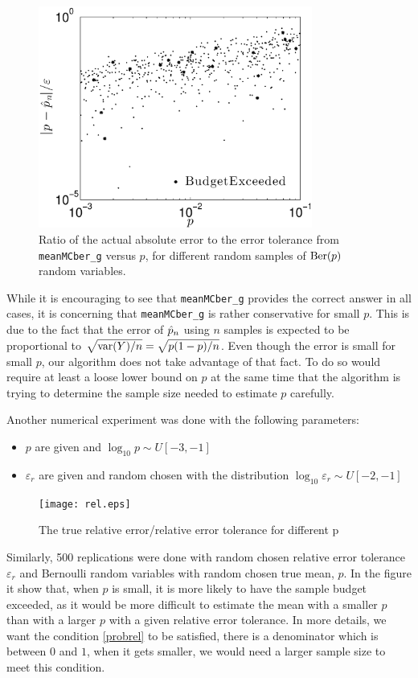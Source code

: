 \documentclass{iitthesis}
\theoremstyle{definition}
\begin{document}
  \begin{figure}[htbp]
    \centering
    \includegraphics[width=9cm]{abs.eps} %
    \caption{Ratio of the actual absolute error to the error tolerance from {\tt meanMCber\_g} versus $p$, for different random samples of $\operatorname{Ber}(p)$ random variables.}
    \label{fig:abserrex}
 \end{figure}

 
While it is encouraging to see that {\tt meanMCber\_g} provides the correct answer in all cases, it is concerning that {\tt meanMCber\_g} is rather conservative for small $p$.  This is due to the fact that the error of $\hat{p}_n$ using $n$ samples is expected to be proportional to $\sqrt{\operatorname{var}(Y)/n}=\sqrt{p(1-p)/n}$.  Even though the error is small for small $p$, our algorithm does not take advantage of that fact.  To do so would require at least a loose lower bound on $p$ at the same time that the algorithm is trying to determine the sample size needed to estimate $p$ carefully.

Another numerical experiment was done with the following parameters:
\begin{itemize}
\item $p$ are given and $\log_{10} p \sim U [-3,-1]$
\item $\varepsilon_r$ are given and random chosen with the distribution $\log_{10} \varepsilon_r \sim U[-2,-1]$
\end{itemize}
  \begin{figure}[htbp]
    \centering
    \texttt{[image: rel.eps]} %
    \caption{The true relative error/relative error tolerance for different p}
    \label{fig:relerrex}
 \end{figure}
  Similarly, 500 replications were done with random chosen relative error tolerance $\varepsilon_r$ and Bernoulli random variables with random chosen true mean, $p$. In the figure it show that, when $p$ is small, it is more likely to have the sample budget exceeded, as it would be more difficult to estimate the mean with a smaller $p$ than with a larger $p$ with a given relative error tolerance. In more details, we want the condition \eqref{probrel} to be satisfied, there is a denominator which is between $0$ and $1$,  when it gets smaller, we would need a larger sample size to meet this condition.
\end{document}
